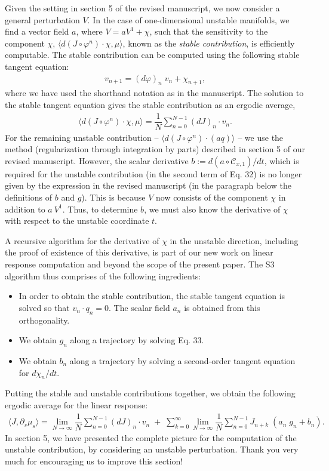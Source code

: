 \documentclass[11pt]{article}
\begin{document}
Given the setting in section 5 of the revised manuscript, we now consider a general perturbation $V.$ In the case of one-dimensional unstable manifolds, we find a vector field $a$, where $V = a V^1 + \chi$, such that the sensitivity to the component $\chi$, $\langle d(J \circ \varphi^n) \cdot \chi, \mu\rangle$, known as the {\em stable contribution}, is efficiently computable. The stable contribution can be computed using the following stable tangent equation:  
\begin{align}
		v_{n+1} = (d\varphi)_n\; v_n + \chi_{n+1},
\end{align}
where we have used the shorthand notation as in the manuscript. The solution to the stable tangent equation gives the stable contribution as an ergodic average,
\begin{align}
	\langle d(J\circ\varphi^n) \cdot \chi,\mu \rangle = 
		\dfrac{1}{N}\sum_{n=0}^{N-1} (dJ)_n \cdot v_n.
\end{align}
For the remaining unstable contribution -- $\langle d(J\circ\varphi^n) \cdot (aq) \rangle$ -- we use the method (regularization through integration by parts) described in section 5 of our revised manuscript. However, the scalar derivative $b := d(a\circ \mathcal{C}_{x,1})/dt$, which is required for the unstable contribution (in the second term of Eq. 32) is no longer given by the expression in the revised manuscript (in the paragraph below the definitions of $b$ and $g$). This is because $V$ now consists of the component $\chi$ in addition to $a\: V^1$. Thus, to determine $b$, we must also know the derivative of $\chi$ with respect to the unstable coordinate $t$. 

A recursive algorithm for the derivative of $\chi$ in the unstable direction, including the proof of existence of this derivative, is part of our new work on linear response computation and beyond the scope of the present paper. The S3 algorithm thus comprises of the following ingredients:
\begin{itemize}
	\item In order to obtain the stable contribution, the stable tangent equation is solved so that $v_n \cdot q_n = 0$. The scalar field $a_n$ is obtained from this orthogonality.
		\item We obtain $g_n$ along a trajectory by solving Eq. 33. 
		\item We obtain $b_n$ along a trajectory by solving a second-order tangent equation for $d\chi_n/dt$.
\end{itemize}
Putting the stable and unstable contributions together, we obtain the following ergodic average for the linear response:
\begin{align}
	\langle J, \partial_s\mu_s\rangle = \lim_{N\to\infty}
		\dfrac{1}{N} \sum_{n=0}^{N-1}(dJ)_n\cdot v_n \; +\; \sum_{k=0}^\infty \lim_{N\to\infty}
		\dfrac{1}{N} \sum_{n=0}^{N-1}  J_{n+k} \; (a_n\; g_n + b_n )   .
\end{align}
In section 5, we have presented the complete picture for the computation of the unstable contribution, by considering an unstable perturbation. Thank you very much for encouraging us to improve this section! 
\end{document}
